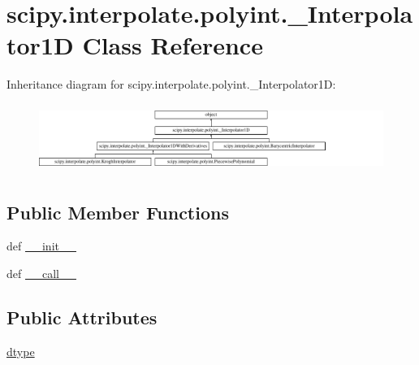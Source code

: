 \hypertarget{classscipy_1_1interpolate_1_1polyint_1_1__Interpolator1D}{}\section{scipy.\+interpolate.\+polyint.\+\_\+\+Interpolator1\+D Class Reference}
\label{classscipy_1_1interpolate_1_1polyint_1_1__Interpolator1D}
Inheritance diagram for scipy.\+interpolate.\+polyint.\+\_\+\+Interpolator1\+D\+:\begin{figure}[H]
\begin{center}
\leavevmode
\includegraphics[height=2.242242cm]{classscipy_1_1interpolate_1_1polyint_1_1__Interpolator1D}
\end{center}
\end{figure}
\subsection*{Public Member Functions}
\begin{DoxyCompactItemize}
\item 
def \hyperlink{classscipy_1_1interpolate_1_1polyint_1_1__Interpolator1D_ac32a2d5932a50baef5042c92cd169c05}{\+\_\+\+\_\+init\+\_\+\+\_\+}
\item 
def \hyperlink{classscipy_1_1interpolate_1_1polyint_1_1__Interpolator1D_a0a5b848d116216b585098b35f71248c0}{\+\_\+\+\_\+call\+\_\+\+\_\+}
\end{DoxyCompactItemize}
\subsection*{Public Attributes}
\begin{DoxyCompactItemize}
\item 
\hyperlink{classscipy_1_1interpolate_1_1polyint_1_1__Interpolator1D_ab6e2e2a41885a338f07101212d57204d}{dtype}
\end{DoxyCompactItemize}


